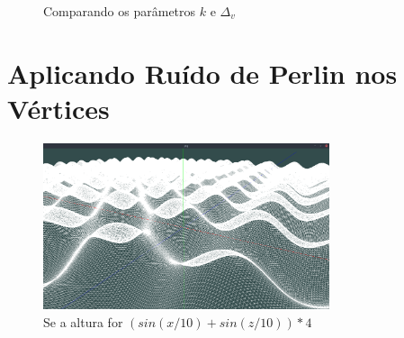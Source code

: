 \begin{figure}[H]
     \centering
     \hspace{0.1cm}
     \hspace{0.1cm}
     \caption{Comparando os parâmetros $k$ e $\Delta_{v}$}
     \label{fig:parametrosGrid}
\end{figure}


\section{Aplicando Ruído de Perlin nos Vértices}


\begin{figure}[H]
    \centering
    \includegraphics[width=0.75\textwidth]{figuras/sssins.png}
    \caption{Se a altura for $(sin(x/10) + sin(z/10)) * 4$}
    \label{fig:sssins}
\end{figure}

